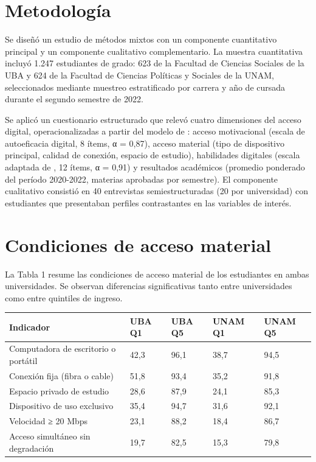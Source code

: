 \documentclass{article}
\begin{document}
\section{Metodología}
Se diseñó un estudio de métodos mixtos con un componente cuantitativo principal y un componente cualitativo complementario. La muestra cuantitativa incluyó 1.247 estudiantes de grado: 623 de la Facultad de Ciencias Sociales de la UBA y 624 de la Facultad de Ciencias Políticas y Sociales de la UNAM, seleccionados mediante muestreo estratificado por carrera y año de cursada durante el segundo semestre de 2022.

Se aplicó un cuestionario estructurado que relevó cuatro dimensiones del acceso digital, operacionalizadas a partir del modelo de \textcite{2563-VANDIJK2020}: acceso motivacional (escala de autoeficacia digital, 8 ítems, α = 0,87), acceso material (tipo de dispositivo principal, calidad de conexión, espacio de estudio), habilidades digitales (escala adaptada de \textcite{2666-VANDEURSEN2019}, 12 ítems, α = 0,91) y resultados académicos (promedio ponderado del período 2020-2022, materias aprobadas por semestre). El componente cualitativo consistió en 40 entrevistas semiestructuradas (20 por universidad) con estudiantes que presentaban perfiles contrastantes en las variables de interés.


\section{Condiciones de acceso material}
La Tabla 1 resume las condiciones de acceso material de los estudiantes en ambas universidades. Se observan diferencias significativas tanto entre universidades como entre quintiles de ingreso.


\begin{table}[!ht]
\centering
{\sf\footnotesize\setlength\tabcolsep{4pt}%
  \begin{tabular}{@{}lllll@{}}
    \toprule
    \textbf{\textbf{Indicador}} & \textbf{\textbf{UBA Q1}} & \textbf{\textbf{UBA Q5}} & \textbf{\textbf{UNAM Q1}} & \textbf{\textbf{UNAM Q5}} \\
    \midrule
    Computadora de escritorio o portátil & 42,3 & 96,1 & 38,7 & 94,5 \\
    \midrule
    Conexión fija (fibra o cable) & 51,8 & 93,4 & 35,2 & 91,8 \\
    \midrule
    Espacio privado de estudio & 28,6 & 87,9 & 24,1 & 85,3 \\
    \midrule
    Dispositivo de uso exclusivo & 35,4 & 94,7 & 31,6 & 92,1 \\
    \midrule
    Velocidad ≥ 20 Mbps & 23,1 & 88,2 & 18,4 & 86,7 \\
    \midrule
    Acceso simultáneo sin degradación & 19,7 & 82,5 & 15,3 & 79,8 \\
    \bottomrule
  \end{tabular}
}%
\label{tbl-1}
\end{table}
\end{document}
